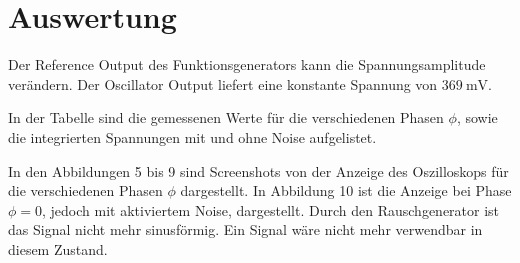 \section{Auswertung}
\label{sec:Auswertung}

Der Reference Output des Funktionsgenerators kann die Spannungsamplitude verändern. Der Oscillator Output liefert
eine konstante Spannung von $\SI{369}{\milli\V}$.\\

\begin{table}
    \centering
    
    \caption{In der Tabelle sind die gemessenen Werte für die verschiedenen Phasen $\phi$, sowie die integrierten Spannungen mit und ohne Noise aufgelistet.}
\end{table}
In den Abbildungen 5 bis 9 sind Screenshots von der Anzeige des Oszilloskops für die verschiedenen Phasen $\phi$ dargestellt. In Abbildung 10 ist
die Anzeige bei Phase $\phi = 0$, jedoch mit aktiviertem Noise, dargestellt. Durch den Rauschgenerator ist das Signal nicht mehr sinusförmig. Ein Signal wäre nicht mehr verwendbar in diesem Zustand.\\
